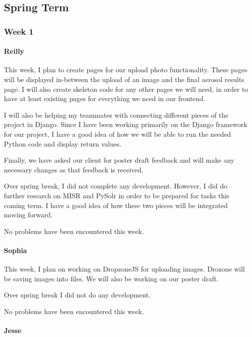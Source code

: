 \documentclass[onecolumn, draftclsnofoot,10pt, compsoc]{IEEEtran}
\begin{document}
\begin{flushleft}
\subsection{Spring Term}
\subsubsection{Week 1}
\paragraph{Reilly}
 
This week, I plan to create pages for our upload photo functionality. These pages will be displayed in-between the upload of an image and the final aerosol results page. I will also create skeleton code for any other pages we will need, in order to have at least existing pages for everything we need in our frontend.
 
I will also be helping my teammates with connecting different pieces of the project in Django. Since I have been working primarily on the Django framework for our project, I have a good idea of how we will be able to run the needed Python code and display return values.
 
Finally, we have asked our client for poster draft feedback and will make any necessary changes as that feedback is received.
 
 
Over spring break, I did not complete any development. However, I did do further research on MISR and PySolr in order to be prepared for tasks this coming term. I have a good idea of how these two pieces will be integrated moving forward.
 
 
No problems have been encountered this week.
 
\paragraph{Sophia}
 
This week, I plan on working on DropzoneJS for uploading images. Drozone will be saving images into files. We will also be working on our poster draft.
 
 
Over spring break I did not do any development.
 
 
No problems have been encountered this week.
 
\paragraph{Jesse}
 

\end{flushleft}
\end{document}
